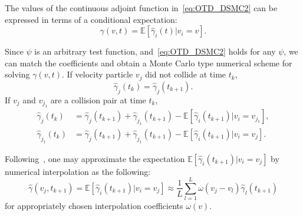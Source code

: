 \documentclass[times,final,nopreprintline]{elsarticle}
\begin{document}
The values of  the continuous adjoint function in~\eqref{eq:OTD_DSMC2} can be expressed in terms of a conditional expectation: 
\begin{equation*}%
    \gamma(v,t)= \mathbb E [\hat \gamma_i(t)|v_i = v].
\end{equation*}


Since $\psi$ is an arbitrary test function, and~\eqref{eq:OTD_DSMC2} holds for any $\psi$, we can match the coefficients and obtain a Monte Carlo type numerical scheme for solving $\gamma(v,t)$.
If velocity particle $v_j$ did not collide at time $t_k$, 
\begin{equation}
   \hat \gamma_j(t_k) = \hat \gamma_j(t_{k+1}).
\end{equation}
If $v_j$ and $v_{j_1}$ are a collision pair at time $t_{k}$,
\begin{subequations}\label{eq:OTD_DSMC3}
\begin{align}
\hat \gamma_j(t_k) &= \hat \gamma_j(t_{k+1}) + \hat \gamma_{j_1}(t_{k+1}) - \mathbb E[\hat \gamma_i (t_{k+1}) |v_i = v_{j_1}],\\
\hat \gamma_{j_1}(t_k) &= \hat \gamma_{j}(t_{k+1}) + \hat \gamma_{j_1}(t_{k+1}) -\mathbb E[\hat \gamma_i(t_{k+1}) |v_i = v_j].
\end{align}
\end{subequations}

Following~\cite{longstaff2001valuing,TsitsiklisRoy},
one may approximate the expectation $\mathbb E[\hat \gamma_i (t_{k+1}) |v_i = v_{j}]$ by numerical interpolation as the following:
\begin{equation}\label{eq:OTD_DSMC4}
\hat \gamma(v_{j} , t_{k+1}) = \mathbb E[\hat \gamma_i (t_{k+1}) |v_i= v_{j}] \approx \frac{1}{L}\sum_{l=1}^L \omega(v_{j}-v_l) \hat \gamma_l (t_{k+1})
\end{equation}
for appropriately chosen interpolation coefficients $\omega(v)$.
\end{document}
